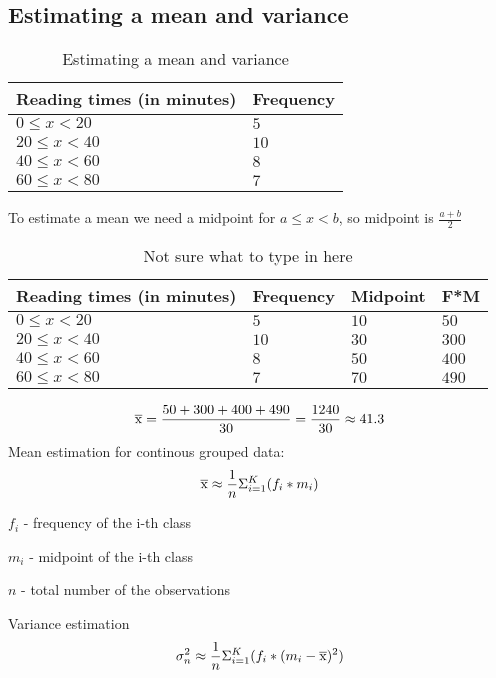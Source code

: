 \documentclass{article}
\begin{document}
\subsection{Estimating a mean and variance}
\begin{table}[htbp]
\centering
\begin{tabular}{|l|l|}
\hline
\textbf{Reading times (in minutes)} & \textbf{Frequency} \\
\hline
$0 \leqslant x < 20$ & $5$ \\
\hline
$20 \leqslant x < 40$ & $10$ \\
\hline
$40 \leqslant x < 60$ & $8$ \\
\hline
$60 \leqslant x < 80$ & $7$ \\
\hline
\end{tabular}
\caption{Estimating a mean and variance}
\label{tab:estimating_a_mean_and_variance}
\end{table}
To estimate a mean we need a midpoint for $a \leqslant x < b$, so midpoint is $\frac{a+b}{2}$
\begin{table}[htbp]
\centering
\begin{tabular}{|l|l|l|l|}
\hline
\textbf{Reading times (in minutes)} & \textbf{Frequency} & \textbf{Midpoint} & \textbf{F*M} \\
\hline
$0 \leqslant x < 20$ & $5$ & $10$ & $50$ \\
\hline
$20 \leqslant x < 40$ & $10$ & $30$ & $300$ \\
\hline
$40 \leqslant x < 60$ & $8$ & $50$ & $400$ \\
\hline
$60 \leqslant x < 80$ & $7$ & $70$ & $490$ \\
\hline
\end{tabular}
\caption{Not sure what to type in here}
\label{tab:estimating_a_mean_and_variance_2}
\end{table}
\begin{equation}
  \overline{\rm x} = \frac{50+300+400+490}{30} = \frac{1240}{30} \approx 41.3
\end{equation}
Mean estimation for continous grouped data:
\begin{equation}
  \overline{\rm x} \approx \frac{1}{n}\Sigma^K_{i=1}(f_i * m_i)
\end{equation}

$f_i$ - frequency of the i-th class

$m_i$ - midpoint of the i-th class

$n$ - total number of the observations

Variance estimation
\begin{equation}
  \sigma^2_n \approx \frac{1}{n}\Sigma^K_{i=1}(f_i * (m_i - \overline{\rm x})^2)
\end{equation}
\end{document}
